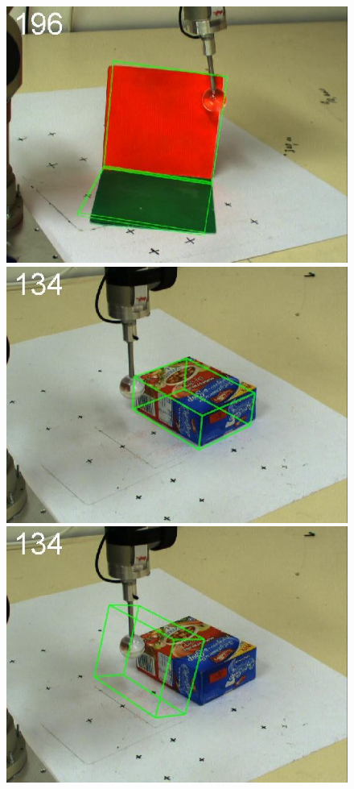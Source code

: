 \begin{figure}[htbp]
{\includegraphics[width=\imgAXwid]{images/A1_2exp_876_3}
\includegraphics[width=\imgAXwid]{images/A2_2exp_399_3}
\includegraphics[width=\imgAXwid]{images/A2_LWPR1_399_3}
}
\end{figure}
